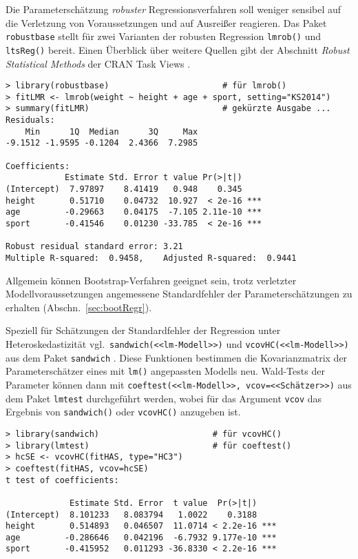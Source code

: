 Die Parameterschätzung \emph{robuster} Regressionsverfahren soll weniger sensibel auf die Verletzung von Voraussetzungen und auf Ausreißer reagieren. Das Paket \lstinline!robustbase! stellt für zwei Varianten der robusten Regression \lstinline!lmrob()! und  \lstinline!ltsReg()! bereit. Einen Überblick über weitere Quellen gibt der Abschnitt \emph{Robust Statistical Methods} der CRAN Task Views \cite{CRANtvRobust}.
\begin{lstlisting}
> library(robustbase)                       # für lmrob()
> fitLMR <- lmrob(weight ~ height + age + sport, setting="KS2014")
> summary(fitLMR)                           # gekürzte Ausgabe ...
Residuals:
    Min      1Q  Median      3Q     Max 
-9.1512 -1.9595 -0.1204  2.4366  7.2985 

Coefficients:
            Estimate Std. Error t value Pr(>|t|)    
(Intercept)  7.97897    8.41419   0.948    0.345    
height       0.51710    0.04732  10.927  < 2e-16 ***
age         -0.29663    0.04175  -7.105 2.11e-10 ***
sport       -0.41546    0.01230 -33.785  < 2e-16 ***

Robust residual standard error: 3.21 
Multiple R-squared:  0.9458,    Adjusted R-squared:  0.9441
\end{lstlisting}

Allgemein können Bootstrap-Verfahren geeignet sein, trotz verletzter Modellvoraussetzungen angemessene Standardfehler der Parameterschätzungen zu erhalten (Abschn.\ \ref{sec:bootRegr}).

Speziell für Schätzungen der Standardfehler der Regression unter Heteroskedastizität vgl.\ \lstinline!sandwich(<<lm-Modell>>)! und \lstinline!vcovHC(<<lm-Modell>>)! aus dem Paket \lstinline!sandwich! \cite{Zeileis2004}. Diese Funktionen bestimmen die Kovarianzmatrix der Parameterschätzer eines mit \lstinline!lm()! angepassten Modells neu. Wald-Tests der Parameter können dann mit \lstinline!coeftest(<<lm-Modell>>, vcov=<<Schätzer>>)! aus dem Paket  \lstinline!lmtest! durchgeführt werden, wobei für das Argument \lstinline!vcov! das Ergebnis von \lstinline!sandwich()! oder \lstinline!vcovHC()! anzugeben ist.
\begin{lstlisting}
> library(sandwich)                       # für vcovHC()
> library(lmtest)                         # für coeftest()
> hcSE <- vcovHC(fitHAS, type="HC3")
> coeftest(fitHAS, vcov=hcSE)
t test of coefficients:

             Estimate Std. Error  t value  Pr(>|t|)
(Intercept)  8.101233   8.083794   1.0022    0.3188
height       0.514893   0.046507  11.0714 < 2.2e-16 ***
age         -0.286646   0.042196  -6.7932 9.177e-10 ***
sport       -0.415952   0.011293 -36.8330 < 2.2e-16 ***
\end{lstlisting}

